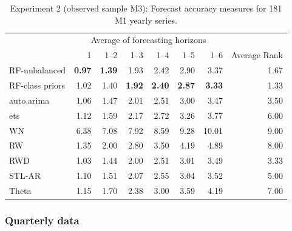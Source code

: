 \documentclass[11pt,a4paper,]{article}
\theoremstyle{definition}
\theoremstyle{definition}
\theoremstyle{definition}
\theoremstyle{remark}
\begin{document}
\begin{table}[!htbp]
\centering\small
\caption{Experiment 2 (observed sample M3): Forecast accuracy measures for 181 M1 yearly series.}
\label{YM1}
\begin{tabular}{lrrrrrrr}
\toprule
 & \multicolumn{6}{c}{Average of forecasting horizons} \\ 
                & 1         & 1--2      & 1--3      & 1--4      & 1--5      & 1--6      & Average Rank \\
\midrule
RF-unbalanced   & \bf{0.97} & \bf{1.39} & 1.93      & 2.42      & 2.90      & 3.37      & 1.67 \\
RF-class priors & 1.02      & 1.40      & \bf{1.92} & \bf{2.40} & \bf{2.87} & \bf{3.33} & 1.33  \\
auto.arima      & 1.06      & 1.47      & 2.01      & 2.51      & 3.00      & 3.47      & 3.50 \\
ets             & 1.12      & 1.59      & 2.17      & 2.72      & 3.26      & 3.77      & 6.00\\
WN              & 6.38      & 7.08      & 7.92      & 8.59      & 9.28      & 10.01     & 9.00\\
RW              & 1.35      & 2.00      & 2.80      & 3.50      & 4.19      & 4.89      & 8.00\\
RWD             & 1.03      & 1.44      & 2.00      & 2.51      & 3.01      & 3.49      & 3.33 \\
STL-AR          & 1.10      & 1.51      & 2.07      & 2.55      & 3.04      & 3.52      & 5.00 \\
Theta           & 1.15      & 1.70      & 2.38      & 3.00      & 3.59      & 4.19      & 7.00 \\
\bottomrule
\end{tabular}
\end{table}

\subsubsection*{Quarterly data}\label{quarterly-data}
\end{document}
